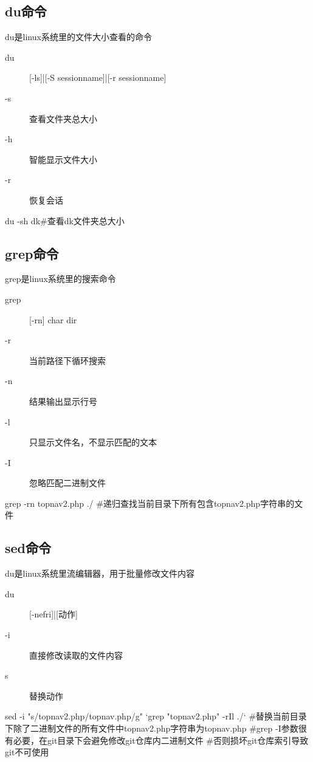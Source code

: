 \subsection{du命令}
	du是linux系统里的文件大小查看的命令
	\begin{description}
		\item[du] [-ls]|[-S sessionname]|[-r sessionname]
		\item[-s] 查看文件夹总大小
		\item[-h] 智能显示文件大小
		\item[-r] 恢复会话
	\end{description}
\begin{shell}
du -sh dk#查看dk文件夹总大小
\end{shell}
\subsection{grep命令}
	grep是linux系统里的搜索命令
	\begin{description}
		\item[grep] [-rn] char dir
		\item[-r] 当前路径下循环搜索
		\item[-n] 结果输出显示行号
		\item[-l] 只显示文件名，不显示匹配的文本
		\item[-I] 忽略匹配二进制文件
	\end{description}
\begin{shell}
grep -rn  topnav2.php ./
#递归查找当前目录下所有包含topnav2.php字符串的文件
\end{shell}
\subsection{sed命令}
	du是linux系统里流编辑器，用于批量修改文件内容
	\begin{description}
		\item[du] [-nefri]|[动作]
		\item[-i] 直接修改读取的文件内容
		\item[s] 替换动作
	\end{description}
\begin{shell}
sed -i "s/topnav2.php/topnav.php/g" `grep "topnav2.php" -rIl ./`
#替换当前目录下除了二进制文件的所有文件中topnav2.php字符串为topnav.php
#grep -I参数很有必要，在git目录下会避免修改git仓库内二进制文件
#否则损坏git仓库索引导致git不可使用
\end{shell}



